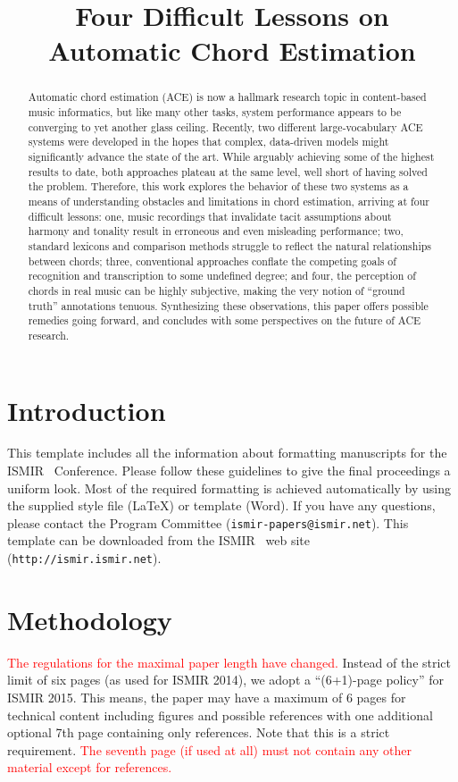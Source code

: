 \documentclass{article}
\title{Four Difficult Lessons on Automatic Chord Estimation}
\begin{document}
%
\maketitle
%
\begin{abstract}

Automatic chord estimation (ACE) is now a hallmark research topic in content-based music informatics, but like many other tasks, system performance appears to be converging to yet another glass ceiling.
Recently, two different large-vocabulary ACE systems were developed in the hopes that complex, data-driven models might significantly advance the state of the art.
While arguably achieving some of the highest results to date, both approaches plateau at the same level, well short of having solved the problem.
Therefore, this work explores the behavior of these two systems as a means of understanding obstacles and limitations in chord estimation, arriving at four difficult lessons:
one, music recordings that invalidate tacit assumptions about harmony and tonality result in erroneous and even misleading performance;
two, standard lexicons and comparison methods struggle to reflect the natural relationships between chords;
three, conventional approaches conflate the competing goals of recognition and transcription to some undefined degree;
and four, the perception of chords in real music can be highly subjective, making the very notion of ``ground truth'' annotations tenuous.
Synthesizing these observations, this paper offers possible remedies going forward, and concludes with some perspectives on the future of ACE research.


\end{abstract}
%
\section{Introduction}\label{sec:introduction}

This template includes all the information about formatting manuscripts for the ISMIR \conferenceyear\ Conference.
Please follow these guidelines to give the final proceedings a uniform look.
Most of the required formatting is achieved automatically by using the supplied
style file (\LaTeX) or template (Word).
If you have any questions, please contact the Program Committee
(\texttt{ismir\conferenceyear-papers@ismir.net}).
This template can be downloaded from the ISMIR \conferenceyear\ web site (\texttt{http://ismir\conferenceyear.ismir.net}).


\section{Methodology}
\textcolor{red}{The regulations for the maximal paper length have changed.}
Instead of the strict limit of six pages (as used for ISMIR 2014), we adopt
a ``(6+1)-page policy'' for ISMIR 2015. This means, the paper may have a
maximum of 6 pages for technical content including figures and possible references
with one additional optional 7th page containing only references.
Note that this is a strict requirement.
\textcolor{red}{The seventh page (if used at all) must
not contain any other material except for references.}
\end{document}
